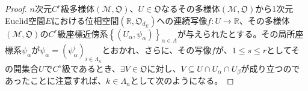 \documentclass[dvipdfmx]{jsarticle}
\begin{document}
\begin{proof}
$n$次元$C^{r}$級多様体$\left( \mathcal{M},\mathfrak{O} \right)$、$U \in \mathfrak{O}$なるその多様体$\left( \mathcal{M},\mathfrak{O} \right)$から1次元Euclid空間$E$における位相空間$\left( \mathbb{R},\mathfrak{O}_{d_{E}} \right)$への連続写像$f:U \rightarrow \mathbb{R}$、その多様体$\left( \mathcal{M},\mathfrak{O} \right)$の$C^{r}$級座標近傍系$\left\{ \left( U_{\alpha},\psi_{\alpha} \right) \right\}_{\alpha \in A}$が与えられたとする。その局所座標系$\psi_\alpha $が$\psi_\alpha =\left( \psi_\alpha^i \right)_{i\in \varLambda_n }$とおかれ、さらに、その写像$f$が、$1\leq s \leq r$としてその開集合$U$で$C^{s}$級であるとき、$\exists V\in \mathfrak{O}$に対し、$V\subseteq U\cap U_\alpha \cap U_\beta $が成り立つのであったことに注意すれば、$k\in \varLambda_n $として次のようになる。
\begin{comment}
\begin{align*}
\frac{\partial f}{\partial \psi_\alpha^i } &=\partial_i \left( f|V \circ \psi_\alpha^{-1} |V \left( \psi_\alpha |V \right)\right) \circ \psi_\alpha |V \\
&=\partial_i \left( f|V \circ \left( \psi_\beta |V\right)^{-1} \circ \psi_\beta |V \circ \psi_\alpha^{-1} |V \left( \psi_\alpha |V \right)\right) \circ \psi_\alpha |V \\
&=\partial_i \left( f|V \circ \psi_\beta^{-1} |V\left( \psi_\beta |V \right) \circ \psi_\beta |V \circ \psi_\alpha^{-1} |V \left( \psi_\alpha |V \right)\right) \circ \psi_\alpha |V \\
&=\left( \partial_k \left( f|V \circ \psi_\beta^{-1} |V\left( \psi_\beta |V \right) \right) \circ \psi_\beta |V \circ \psi_\alpha^{-1} |V \left( \psi_\alpha |V \right) \right) \\
&\quad \partial_i \left( \psi_\beta^k |V \circ \psi_\alpha^{-1} |V \left( \psi_\alpha |V \right) \right) \circ \psi_\alpha |V \\
&=\left( \partial_k \left( f|V \circ \psi_\beta^{-1} |V\left( \psi_\beta |V \right) \right) \circ \psi_\beta |V \circ \left( \psi_\alpha |V \right)^{-1} \circ \psi_\alpha |V \right) \\
&\quad \left( \partial_i \left( \psi_\beta^k |V \circ \psi_\alpha^{-1} |V \left( \psi_\alpha |V \right) \right) \circ \psi_\alpha |V \right) \\
&=\left( \partial_k \left( f|V \circ \psi_\beta^{-1} |V\left( \psi_\beta |V \right) \right) \circ \psi_\beta |V \right) \\
&\quad \left( \partial_i \left( \psi_\beta^k |V \circ \psi_\alpha^{-1} |V \left( \psi_\alpha |V \right) \right) \circ \psi_\alpha |V \right) \\

\end{comment}
\end{proof}
\end{document}
